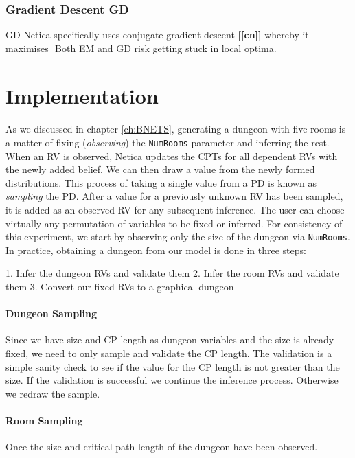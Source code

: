 \documentclass{UoYCSproject}
\begin{document}
\subsubsection{Gradient Descent GD}
GD Netica specifically uses conjugate gradient descent \textbf{[[cn]]} whereby it maximises \(\)
Both EM and GD risk getting stuck in local optima.

\section{Implementation}
\label{sec:implementation}
\paragraph{}
As we discussed in chapter \ref{ch:BNETS}, generating a dungeon with five rooms is a matter of fixing (\textit{observing}) the \texttt{NumRooms} parameter and inferring the rest. When an RV is observed, Netica updates the CPTs for all dependent RVs with the newly added belief. We can then draw a value from the newly formed distributions. This process of taking a single value from a PD is known as \textit{sampling} the PD. After a value for a previously unknown RV has been sampled, it is added as an observed RV for any subsequent inference. The user can choose virtually any permutation of variables to be fixed or inferred. For consistency of this experiment, we start by observing only the size of the dungeon via \texttt{NumRooms}. In practice, obtaining a dungeon from our model is done in three steps:

1. Infer the dungeon RVs and validate them
2. Infer the room RVs and validate them
3. Convert our fixed RVs to a graphical dungeon

\paragraph{Dungeon Sampling} %
 Since we have size and CP length as dungeon variables and the size is already fixed, we need to only sample and validate the CP length. The validation is a simple sanity check to see if the value for the CP length is not greater than the size. If the validation is successful we continue the inference process. Otherwise we redraw the sample.

\paragraph{Room Sampling}
Once the size and critical path length of the dungeon have been observed.
\end{document}
